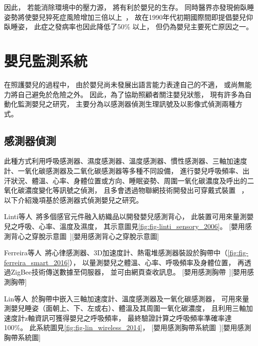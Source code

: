 \documentclass[class=NCU_thesis, crop=false]{standalone}
\begin{document}
因此，
若能消除環境中的壓力源，
將有利於嬰兒的生存。
同時醫界亦發現俯臥睡姿勢將使嬰兒猝死症風險增加三倍以上~\cite{willinger_infant_1994}，
故在1990年代初期國際間即提倡嬰兒仰臥睡姿，
此症之發病率也因此降低了50\% 以上，
但仍為嬰兒主要死亡原因之一。

\section{嬰兒監測系統}
在照護嬰兒的過程中，
由於嬰兒尚未發展出語言能力表達自己的不適，
或尚無能力將自己避免於危險之外。
因此，為了協助照顧者關注嬰兒狀態，
現有許多為自動化監測嬰兒之研究，
主要分為以感測器偵測生理訊號及以影像式偵測兩種方式。

\subsection{感測器偵測}
此種方式利用呼吸感測器、濕度感測器、溫度感測器、慣性感測器、三軸加速度計、一氧化碳感測器及二氧化碳感測器等多種不同設備，
進行嬰兒呼吸頻率、出汗狀況、體溫、心率、身體位置或方向、睡眠姿勢、周圍一氧化碳濃度及呼出的二氧化碳濃度變化等訊號之偵測，
且多會透過物聯網技術開發出可穿戴式裝置
~\cite{klingeberg_mobile_2012, zhou_low_2015, bouwstra_smart_2009, malhi_zigbee-based_2012, gonzalez-valenzuela_mobility_2011, 
darwish_wearable_2011, ko_wireless_2010, linti_sensory_2006, ferreira_smart_2016, lin_wireless_2014}，
以下介紹幾項基於感測器式偵測嬰兒之研究。

Linti等人~\cite{linti_sensory_2006}將多個感官元件融入紡織品以開發嬰兒感測背心，
此裝置可用來量測嬰兒之呼吸、心率、溫度及濕度，
其示意圖見\cref{fig:fig-linti_sensory_2006}。
[嬰用感測背心之穿脫示意圖~\cite{linti_sensory_2006}][嬰用感測背心之穿脫示意圖]

Ferreira等人~\cite{ferreira_smart_2016}將心律感測器、3D加速度計、熱電堆感測器裝設於胸帶中（\cref{fig:fig-ferreira_smart_2016}），
以量測嬰兒之體溫、心率、呼吸頻率及身體位置，
再透過ZigBee技術傳送數據至伺服器，
並可由網頁查收訊息。
[嬰用感測胸帶~\cite{ferreira_smart_2016}][嬰用感測胸帶]

Lin等人~\cite{lin_wireless_2014}於胸帶中嵌入三軸加速度計、溫度感測器及一氧化碳感測器，
可用來量測嬰兒睡姿（面朝上、下、左或右）、體溫及其周圍一氧化碳濃度，
且利用三軸加速度計z軸資訊可獲得嬰兒之呼吸頻率，
最終驗證計算之呼吸頻率準確率達100\%。
此系統圖見\cref{fig:fig-lin_wireless_2014}，
[嬰用感測胸帶系統圖~\cite{lin_wireless_2014}][嬰用感測胸帶系統圖]
\end{document}
